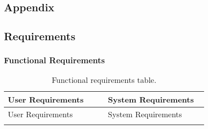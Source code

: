 \begin{appendices}
\chapter{Appendix}
\label{cha:Appendix}

\section{Requirements}
\label{sec:RequirementsAppendix}

\subsection{Functional Requirements}
\label{subsec:Functional Requirements Appendix}
\begin{longtable}{|p{0.1\linewidth}|p{0.4\linewidth}|p{0.1\linewidth}|p{0.4\linewidth}|}
\caption{Functional requirements table.}\label{tab:functionalRequirementsAppendix}\\
\hline
\multicolumn{2}{|l|}{User Requirements} & \multicolumn{2}{l|}{System Requirements} \\
\hline
\endfirsthead

\hline
\multicolumn{2}{|l|}{User Requirements} & \multicolumn{2}{l|}{System Requirements} \\
\hline
\endhead

\hline
\endfoot

\hline
\endlastfoot


\end{longtable}
\end{appendices}
